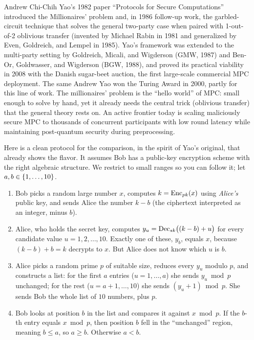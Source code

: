 \begin{historybox}
Andrew Chi-Chih Yao's 1982 paper ``Protocols for Secure Computations'' introduced the Millionaires' problem and, in 1986 follow-up work, the garbled-circuit technique that solves the general two-party case when paired with 1-out-of-2 oblivious transfer (invented by Michael Rabin in 1981 and generalized by Even, Goldreich, and Lempel in 1985). Yao's framework was extended to the multi-party setting by Goldreich, Micali, and Wigderson (GMW, 1987) and Ben-Or, Goldwasser, and Wigderson (BGW, 1988), and proved its practical viability in 2008 with the Danish sugar-beet auction, the first large-scale commercial MPC deployment. The same Andrew Yao won the Turing Award in 2000, partly for this line of work. The millionaires' problem is the ``hello world'' of MPC: small enough to solve by hand, yet it already needs the central trick (oblivious transfer) that the general theory rests on. An active frontier today is scaling maliciously secure MPC to thousands of concurrent participants with low round latency while maintaining post-quantum security during preprocessing.
\end{historybox}

Here is a clean protocol for the comparison, in the spirit of Yao's original, that already shows the flavor. It assumes Bob has a public-key encryption scheme with the right algebraic structure. We restrict to small ranges so you can follow it; let $a, b \in \{1, \dots, 10\}$.

\begin{enumerate}
  \item Bob picks a random large number $x$, computes $k = \operatorname{Enc}_{pk}(x)$ using \emph{Alice's} public key, and sends Alice the number $k - b$ (the ciphertext interpreted as an integer, minus $b$).
  \item Alice, who holds the secret key, computes $y_u = \operatorname{Dec}_{sk}\!\big((k - b) + u\big)$ for every candidate value $u = 1, 2, \dots, 10$. Exactly one of these, $y_b$, equals $x$, because $(k-b)+b = k$ decrypts to $x$. But Alice does not know which $u$ is $b$.
  \item Alice picks a random prime $p$ of suitable size, reduces every $y_u$ modulo $p$, and constructs a list: for the first $a$ entries ($u = 1, \dots, a$) she sends $y_u \bmod p$ unchanged; for the rest ($u = a+1, \dots, 10$) she sends $(y_u + 1) \bmod p$. She sends Bob the whole list of $10$ numbers, plus $p$.
  \item Bob looks at position $b$ in the list and compares it against $x \bmod p$. If the $b$-th entry equals $x \bmod p$, then position $b$ fell in the ``unchanged'' region, meaning $b \le a$, so $a \ge b$. Otherwise $a < b$.
\end{enumerate}


